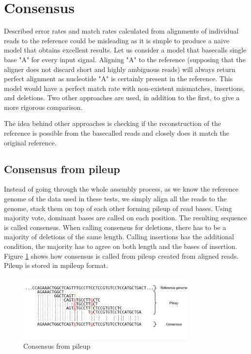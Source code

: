 \documentclass[times, utf8, diplomski, numeric, english]{fer}
\begin{document}
\section{Consensus}
Described error rates and match rates calculated from alignments of individual reads to the reference could be misleading as it is simple to produce a naive model that obtains excellent results. Let us consider a model that basecalls single base "A" for every input signal. Aligning "A" to the reference (supposing that the aligner does not discard short and highly ambiguous reads) will always return perfect alignment as nucleotide "A" is certainly present in the reference. This model would have a perfect match rate with non-existent mismatches, insertions, and deletions. Two other approaches are used, in addition to the first, to give a more rigorous comparison.

The idea behind other approaches is checking if the reconstruction of the reference is possible from the basecalled reads and closely does it match the original reference.

\subsection{Consensus from pileup}
 Instead of going through the whole assembly process, as we know the reference genome of the data used in these tests, we simply align all the reads to the genome, stack them on top of each other forming pileup of read bases. Using majority vote, dominant bases are called on each position. The resulting sequence is called consensus. When calling consensus for deletions,  there has to be a majority of deletions of the same length. Calling insertions has the additional condition,  the majority has to agree on both length and the bases of insertion. Figure \ref{fg:consensus} shows how consensus is called from pileup created from aligned reads. Pileup is stored in mpileup format.  


\begin{figure}[!ht]
	\begin{center}
		\includegraphics[width=0.8\textwidth]{./imgs/consnesus.png}
		\caption{Consensus from pileup}
		\label{fg:consensus}
	\end{center}
\end{figure}
\end{document}
